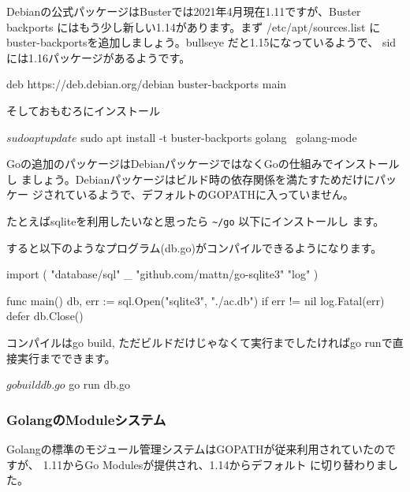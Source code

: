 \documentclass[mingoth,a4paper]{jsarticle}
\begin{document}
Debianの公式パッケージはBusterでは2021年4月現在1.11ですが、Buster
backports にはもう少し新しい1.14があります。まず /etc/apt/sources.list
に buster-backportsを追加しましょう。bullseye だと1.15になっているようで、
sidには1.16パッケージがあるようです。

\begin{commandline}
deb https://deb.debian.org/debian buster-backports main
\end{commandline}

そしておもむろにインストール

\begin{commandline}
$ sudo apt update
$ sudo apt install -t buster-backports golang \
  golang-mode
\end{commandline}

Goの追加のパッケージはDebianパッケージではなくGoの仕組みでインストールし
ましょう。Debianパッケージはビルド時の依存関係を満たすためだけにパッケー
ジされているようで、デフォルトのGOPATHに入っていません。

たとえばsqliteを利用したいなと思ったら \verb!~/go! 以下にインストールし
ます。


すると以下のようなプログラム(db.go)がコンパイルできるようになります。

\begin{commandline}
import (
	"database/sql"
	_ "github.com/mattn/go-sqlite3"
	"log"
)

func main() {
	db, err := sql.Open("sqlite3", "./ac.db")
	if err != nil {
		log.Fatal(err)
	}
	defer db.Close()
}

\end{commandline}

コンパイルはgo build, ただビルドだけじゃなくて実行までしたければgo runで直接実行までできます。

\begin{commandline}
$ go build db.go
$ go run db.go
\end{commandline}

\subsubsection{GolangのModuleシステム}

Golangの標準のモジュール管理システムはGOPATHが従来利用されていたのですが、
1.11からGo Modules\cite{golang:go-modules}が提供され、1.14からデフォルト
に切り替わりました。
\end{document}
